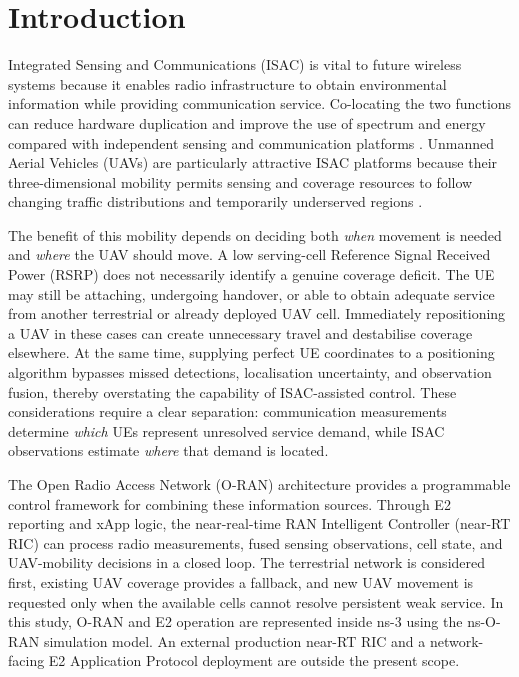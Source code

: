\section{Introduction}
\label{sec:introduction}

Integrated Sensing and Communications (ISAC) is vital to future wireless
systems because it enables radio infrastructure to obtain environmental
information while providing communication service. Co-locating the two
functions can reduce
hardware duplication and improve the use of spectrum and energy compared
with independent sensing and communication platforms
\cite{ahmed2025advancements}. Unmanned Aerial Vehicles (UAVs) are particularly
attractive ISAC platforms because their three-dimensional mobility permits
sensing and coverage resources to follow changing traffic distributions and
temporarily underserved regions \cite{meng2023uav,mu2023uav}.

The benefit of this mobility depends on deciding both \emph{when} movement is
needed and \emph{where} the UAV should move. A low serving-cell Reference
Signal Received Power (RSRP) does not necessarily identify a genuine coverage
deficit. The UE may still be attaching, undergoing handover, or able to obtain
adequate service from another terrestrial or already deployed UAV cell.
Immediately repositioning a UAV in these cases can create unnecessary travel
and destabilise coverage elsewhere. At the same time, supplying perfect UE
coordinates to a positioning algorithm bypasses missed detections,
localisation uncertainty, and observation fusion, thereby overstating the
capability of ISAC-assisted control. These considerations require a clear
separation: communication measurements determine \emph{which} UEs represent
unresolved service demand, while ISAC observations estimate \emph{where} that
demand is located.

The Open Radio Access Network (O-RAN) architecture provides a programmable
control framework for combining these information sources. Through E2
reporting and xApp logic, the near-real-time RAN Intelligent Controller
(near-RT RIC) can process radio measurements, fused sensing observations,
cell state, and UAV-mobility decisions in a closed loop. The terrestrial
network is considered first, existing UAV coverage provides a fallback, and
new UAV movement is requested only when the available cells cannot resolve
persistent weak service. In this study, O-RAN and E2 operation are represented
inside ns-3 using the ns-O-RAN simulation model. An external production
near-RT RIC and a network-facing E2 Application Protocol deployment are
outside the present scope.

